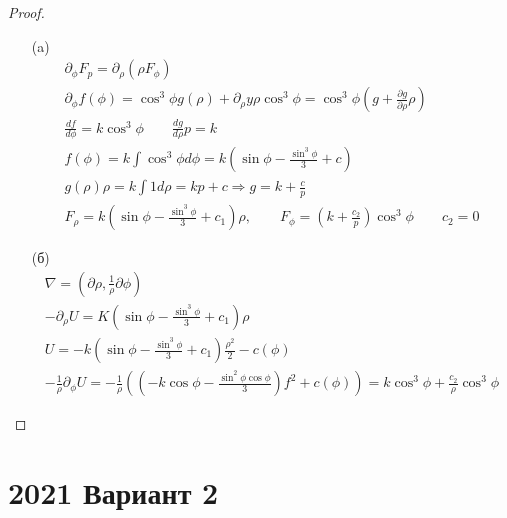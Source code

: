 \begin{proof}
\begin{itemize}
\item[]
\item[(a)]
    \begin{gather*}
        \partial_{\phi} F_p
        = \partial_{\rho} \left(\rho F_{\phi}\right)\\
        \partial_{\phi} f(\phi)
        = \cos^3 \phi g(\rho) + \partial_{\rho} y \rho \cos^{3} \phi
        = \cos^3 \phi \left(g + \frac{\partial g}{\partial \rho}\rho\right)\\
        \frac{d f}{d \phi} = k \cos^3 \phi\qquad
        \frac{d g}{d \rho} p = k\\
        f(\phi) = k \int \cos^3 \phi d \phi = k \left(\sin \phi - \frac{\sin^3 \phi}{3} + c\right)\\
        g(\rho) \rho = k \int 1 d \rho = kp + c \Rightarrow
        g = k + \frac{c}{p}\\
        F_{\rho} = k \left(\sin \phi - \frac{\sin^3 \phi}{3} + c_1\right) \rho,\qquad
        F_{\phi} = \left(k + \frac{c_2}{p}\right) \cos^3 \phi\qquad
        c_2 = 0
    \end{gather*}
\item[(б)]
    \begin{gather*}
        \nabla = \left(\partial \rho, \frac{1}{\rho} \partial \phi\right)\\
        -\partial_{\rho} U = K \left(\sin \phi - \frac{\sin^3 \phi}{3} + c_1\right)\rho\\
        U = -k \left(\sin \phi - \frac{\sin^3 \phi}{3} + c_1\right) \frac{\rho^2}{2} - c(\phi)\\
        -\frac{1}{\rho} \partial_{\phi} U = -\frac{1}{\rho}\left(\left(-k \cos \phi - \frac{\sin^2 \phi \cos \phi}{3}\right)f^2 + c(\phi)\right)
        = k \cos^3 \phi + \frac{c_2}{\rho} \cos^3 \phi
    \end{gather*}
\end{itemize}
\end{proof}
\newpage




\section{2021 Вариант 2}

